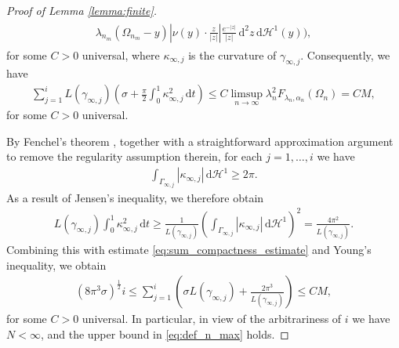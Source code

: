 \documentclass[11pt]{article}
\numberwithin{statement}{section}
\numberwithin{equation}{section}
\theoremstyle{remark}
\newcommand{\intd}{\, \mathrm{d}} 				%
\newcommand{\Hd}{\mathcal H}				%
\begin{document}
\begin{proof}[Proof of Lemma \ref{lemma:finite}]
\begin{align}
\begin{split}
{              \lambda_{n_m}(\Omega_{n_m} - y) } \left| \nu(y) \cdot
              \frac{ z}{|z|} \right| \frac{e^{-|z|}}{|z|} \intd^2 z
            \intd \Hd^1(y) \Bigg),
           \end{split}
         \end{align}
         for some $C > 0$ universal, where $ \kappa_{\infty,j}$
         is the curvature of $ \gamma_{\infty,j}$.  Consequently, we
         have
         \begin{align}\label{eq:sum_compactness_estimate}
           \sum_{j=1}^i L( \gamma_{\infty,j}) \left(\sigma  +
           \frac{\pi}{2} \int_0^1 \kappa_{\infty,j}^2
           \intd t\right) 
           \leq C \limsup_{n \to \infty}
           \lambda_n^2 F_{\lambda_n,\alpha_n}(\Omega_n) =
           C M,
	\end{align}
	for some $C > 0$ universal.
	
	By Fenchel's theorem \cite[Theorem 3 and Remark 5, Section
        5.7]{docarmo}, together with a straightforward approximation
        argument to remove the regularity assumption therein, for
          each $j = 1, \ldots, i$ we have
	\begin{align}
          \int_{ \Gamma_{\infty,j}} |\kappa_{\infty,j}| \intd \Hd^1
          \geq 2\pi. 
	\end{align}
	As a result of Jensen's inequality, we therefore obtain
		\begin{align}
          L( \gamma_{\infty,j}) \int_0^1  \kappa_{\infty,j}^ 2 \intd t
          \geq \frac{1}{ L( \gamma_{\infty,j})} \left(\int_{
          \Gamma_{\infty,j}} |\kappa_{\infty,j}| \intd \Hd^1 \right)^2
          = \frac{4\pi^2}{ L( \gamma_{\infty,j}) }.
	\end{align}
	Combining this with estimate
        \eqref{eq:sum_compactness_estimate} and Young's inequality, we
        obtain
	\begin{align}
          \left(8\pi^3 \sigma\right)^{\frac{1}{2}}i \leq \sum_{j=1}^i
          \left(\sigma L( \gamma_{\infty,j}) + \frac{2\pi^3}{
          L( \gamma_{\infty,j})} \right) \leq C M,
	\end{align}        
        for some $C > 0$ universal. In particular, in view of the
        arbitrariness of $i$ we have $N < \infty$, and the upper bound
        in \eqref{eq:def_n_max} holds.


\end{proof}
\end{document}
